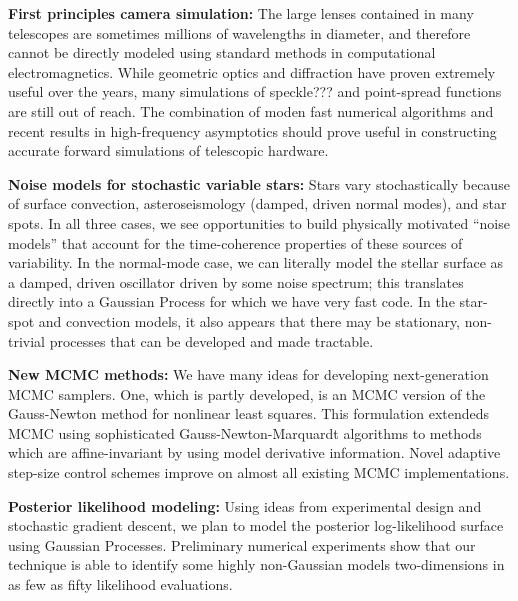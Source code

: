 \documentclass[12pt]{article}
\begin{document}
\textbf{First principles camera simulation:} 
The large lenses contained in many telescopes are sometimes millions of
wavelengths in diameter, and therefore cannot be directly modeled using
standard methods in computational electromagnetics.
While geometric optics and diffraction have proven extremely useful over
the years, many simulations of speckle??? and point-spread functions are
still out of reach.
The combination of moden fast numerical algorithms and recent results in
high-frequency asymptotics should prove useful in constructing accurate
forward simulations of telescopic hardware.  

\textbf{Noise models for stochastic variable stars:}
Stars vary stochastically because of surface convection,
asteroseismology (damped, driven normal modes), and star spots.
In all three cases, we see opportunities to build physically motivated
``noise models'' that account for the time-coherence properties of
these sources of variability.
In the normal-mode case, we can literally model the stellar surface as
a damped, driven oscillator driven by some noise spectrum; this
translates directly into a Gaussian Process for which we have very
fast code.
In the star-spot and convection models, it also appears that there may
be stationary, non-trivial processes that can be developed and made
tractable.

\textbf{New MCMC methods:}
We have many ideas for developing next-generation MCMC samplers.
One, which is partly developed, is an MCMC version of the Gauss-Newton
method for nonlinear least squares.
This formulation extendeds MCMC using sophisticated
Gauss-Newton-Marquardt algorithms to methods which are affine-invariant
by using model derivative information.
Novel adaptive step-size control schemes improve on almost all existing
MCMC implementations.


\textbf{Posterior likelihood modeling:}
Using ideas from experimental design and stochastic gradient
descent, we plan to model the posterior log-likelihood surface using
Gaussian Processes.
Preliminary numerical experiments show that our technique is able to
identify some highly non-Gaussian models two-dimensions in as few as
fifty likelihood evaluations.
\end{document}
